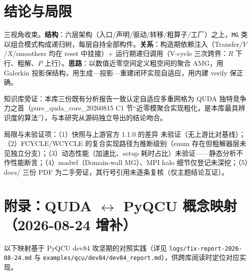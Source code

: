 \documentclass[UTF8]{ctexart}
\begin{document}
\section{结论与局限}

\begin{conclbox}
三视角收束。\textbf{结构}：六层架构（入口/声明/驱动/转移/粗算子/工厂）之上，\texttt{MG} 类以组合模式构成递归树，每层自持全部构件。\textbf{关系}：构造期依赖注入（Transfer/$Y$/$X$/smoothers 均在 reset 中挂接）+ 运行期递归调用（V-cycle 三次跨界：$R$ 下行、粗解、$P$ 上行）。\textbf{思路}：以数值近零空间定义粗空间的聚合 AMG，用 Galerkin 投影保结构，用生成—投影—重建闭环实现自适应，用内建 verify 保正确。
\end{conclbox}

\begin{refbox}
知识库旁证：本库三份既有分析报告一致认定自适应多重网格为 QUDA 独特竞争力之首（\textcolor{reference}{pure\_quda\_core\_20260815 C1 节}``近零模聚合实现粗化，是本库最具辨识度的算法''），与本研究从源码独立导出的结论吻合。
\end{refbox}

\begin{warnbox}
局限与未验证项：（1）快照与上游官方 1.1.0 的差异 \textcolor{warn}{未验证}（无上游比对基线）；（2）FCYCLE/WCYCLE 的复合实现路径为\textcolor{warn}{推断}级别（enum 存在但粗解器层未见独立分支）；（3）动态性能（加速比、setup 耗时占比）\textcolor{warn}{未验证}——静态分析不作性能断言；（4）madwf（Domain-wall MG）、MPI halo 细节仅登记未深挖；（5）docs/ 三份 PDF 为二手旁证，其行号引用未逐条复核（仅主题结论互证）。
\end{warnbox}


\section{\texorpdfstring{附录：QUDA $\leftrightarrow$ PyQCU 概念映射}{附录：QUDA 与 PyQCU 概念映射}（2026-08-24 增补）}

以下映射基于 PyQCU dev84 攻坚期的对照实践（详见 \texttt{logs/fix-report-2026-08-24.md}
与 \texttt{examples/qcu/dev84/dev84\_report.md}），供跨库阅读时定位对应实现。
\end{document}
